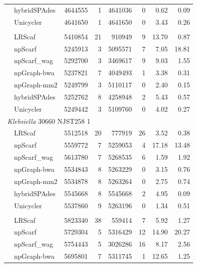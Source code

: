 \documentclass[10pt,letterpaper]{article}
\newcommand{\ec}{\emph{E.~coli}}
\begin{document}
\begin{longtable}[!hpt]{llcrrrrr}
& hybridSPAdes &  4644555 &  1  &  4641036  &  0  & 0.62  & 0.09\\*
& Unicycler & 4641650  &  1 &  4641650 &  0 & 3.43  & 0.26 \\
\hline
\rowcolor{Gray}
\multicolumn{8}{l}{\ec{} O25b H4-ST131} \\* %
\nobreakmidrule
\rowcolor{Gray}
& LRScaf & 5410854 & 21 & 910949 & 9 & 13.70 & 0.87\\*
\rowcolor{Gray}
& npScarf &  5245913 &  3  &  5095571  &  7  &  7.05 & 18.81\\*
\rowcolor{Gray}
& npScarf\_wag & 5292700  &  3  &  3469617  &  9  &  9.03 & 1.55\\*
\rowcolor{Gray}
& npGraph-bwa & 5237821  &  7  &  4049493  &  1  &  3.38 & 0.31\\*
\rowcolor{Gray}
& npGraph-mm2 &  5249799 &  3  &  5110117  &  0  &  2.40 & 0.15\\*
\rowcolor{Gray}
& hybridSPAdes & 5252762  &  8  &  4258948  &  2  &  5.43 &  0.57\\*
\rowcolor{Gray}
& Unicycler & 5249442  &  3  &  5109760  &  0  & 4.02 & 0.27 \\
\hline
\multicolumn{8}{l}{\emph{Klebsiella} 30660 NJST258 1} \\* %
\nobreakmidrule
& LRScaf & 5512518 & 20 & 777919 & 26 & 3.52 & 0.38\\*
& npScarf & 5559772  &  7  &  5259053  &  4  & 17.18  & 13.48\\*
& npScarf\_wag & 5613780  &  7  &  5268535  &  6  & 1.59  & 1.92\\*
& npGraph-bwa & 5534843  &  8  &  5263229  &  0  & 3.15  & 0.76\\*
& npGraph-mm2 & 5534878  &  8  &  5263264  &  0  & 2.75  & 0.74\\*
& hybridSPAdes &  5545668 & 8   &  5545668  &  2  & 4.95  & 0.09 \\*
& Unicycler & 5537860  &  9  &  5263196  &  0  & 1.34  & 0.51 \\
\hline
\rowcolor{Gray}
\multicolumn{8}{l}{\emph{Klebsiella} MGH 78578} \\* %
\nobreakmidrule
\rowcolor{Gray}
& LRScaf & 5823340 & 38 & 559414 & 7 & 5.92 & 1.27\\*
\rowcolor{Gray}
& npScarf &  5729304 &  5  &  5316429  &  12  & 14.90  & 20.27\\*
\rowcolor{Gray}
& npScarf\_wag & 5754443  &  5  &  3026286  &  16  &  8.17 & 2.56\\*
\rowcolor{Gray}
& npGraph-bwa &  5695801 &  7  &  5311745  &  1  & 12.65  & 1.25\\*

\end{longtable}
\end{document}
